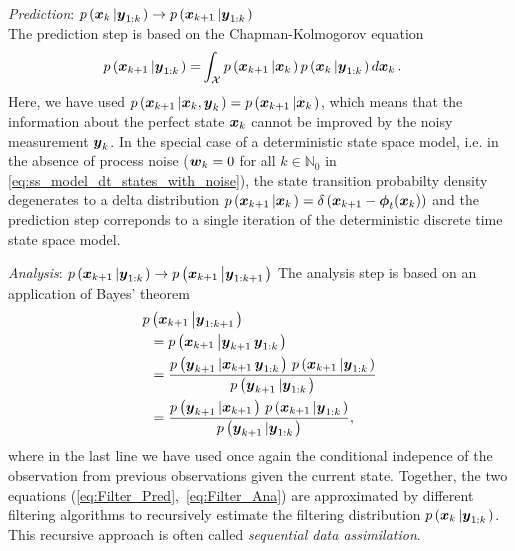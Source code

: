 \documentclass[10pt,a4paper, twocolumn]{article}
\renewcommand{\vec}[1]{{\mbox{\mathversion{bold}\ensuremath{#1}}}}
\begin{document}
\emph{Prediction}: $p\left(\vec{x}_{k}\left|\vec{y}_{1:k}\right.\right) \to p\left(\vec{x}_{k+1}\left|\vec{y}_{1:k}\right.\right)$\\
The prediction step is based on the Chapman-Kolmogorov equation 
\begin{align}\label{eq:Filter_Pred}
p\left(\vec{x}_{k+1}\left|\vec{y}_{1:k}\right.\right) =& \int_{\mathcal{X}} p\left(\vec{x}_{k+1}\left|\vec{x}_{k}\right.\right) p\left(\vec{x}_{k}\left|\vec{y}_{1:k}\right.\right) d\vec{x}_k\,.
\end{align}
Here, we have used  $p\left(\vec{x}_{k+1}\left|\vec{x}_{k},\vec{y}_k\right.\right)=p\left(\vec{x}_{k+1}\left|\vec{x}_{k}\right.\right)$, which means that the information about the perfect state $\vec{x}_k$ cannot be improved by the noisy measurement $\vec{y}_k$. In the special case of a deterministic state space model, i.e. in the absence of  process noise ($\vec{w}_k=0$ for all $k\in\mathbb{N}_0$ in \eqref{eq:ss_model_dt_states_with_noise}), the state transition probabilty density degenerates to a delta distribution $p\left(\vec{x}_{k+1}\left|\vec{x}_{k}\right.\right)=\delta\left(\vec{x}_{k+1}-\vec{\phi}_t(\vec{x}_k) \right)$ and the prediction step correponds to a single iteration of the deterministic discrete time state space model. 

\emph{Analysis}: $p\left(\vec{x}_{k+1}\left|\vec{y}_{1:k}\right.\right) \to p\left(\vec{x}_{k+1}\left|\vec{y}_{1:k+1}\right.\right)$ 
The analysis step is based on an application of  Bayes' theorem 
\begin{align}\label{eq:Filter_Ana}
p&\left(\vec{x}_{k+1} \left|\vec{y}_{1:k+1}\right.\right)  \nonumber\\
&= p\left(\vec{x}_{k+1}\left|\vec{y}_{k+1}\,\vec{y}_{1:k} \right.\right) \nonumber\\
&=  \frac{p\left(\vec{y}_{k+1}\left|\vec{x}_{k+1}\,\vec{y}_{1:k} \right.\right)\, p\left(\vec{x}_{k+1}\left|\vec{y}_{1:k} \right.\right)}{p\left(\vec{y}_{k+1}\left|\vec{y}_{1:k} \right.\right)}\nonumber\\
&= \frac{p\left(\vec{y}_{k+1}\left|\vec{x}_{k+1} \right.\right)\, p\left(\vec{x}_{k+1}\left|\vec{y}_{1:k} \right.\right)}{p\left(\vec{y}_{k+1}\left|\vec{y}_{1:k} \right.\right)},
\end{align}
where in the last line we have used once again the conditional indepence of the observation from previous observations given the current state. Together, the two equations (\ref{eq:Filter_Pred},~\ref{eq:Filter_Ana}) are approximated by different filtering algorithms to recursively estimate the filtering distribution $p\left(\vec{x}_k\left|\vec{y}_{1:k}\right.\right)$. This recursive approach is often called {\em sequential data assimilation}.
%
\end{document}
